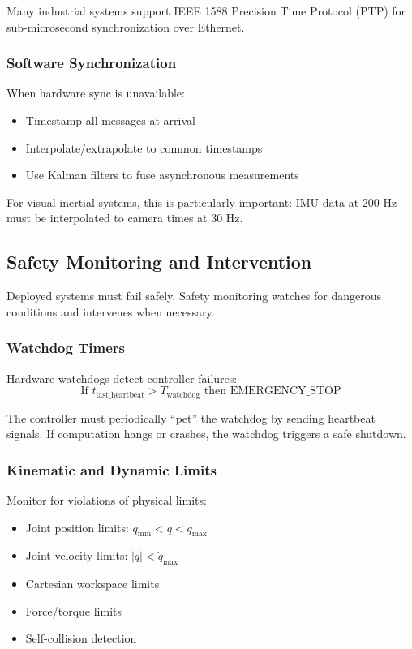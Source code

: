 Many industrial systems support IEEE 1588 Precision Time Protocol (PTP) for sub-microsecond synchronization over Ethernet.

\subsubsection{Software Synchronization}

When hardware sync is unavailable:
\begin{itemize}
    \item Timestamp all messages at arrival
    \item Interpolate/extrapolate to common timestamps
    \item Use Kalman filters to fuse asynchronous measurements
\end{itemize}

For visual-inertial systems, this is particularly important: IMU data at 200 Hz must be interpolated to camera times at 30 Hz.

\subsection{Safety Monitoring and Intervention}

Deployed systems must fail safely. Safety monitoring watches for dangerous conditions and intervenes when necessary.

\subsubsection{Watchdog Timers}

Hardware watchdogs detect controller failures:
\begin{equation}
\text{If } t_{\text{last\_heartbeat}} > T_{\text{watchdog}} \text{ then } \text{EMERGENCY\_STOP}
\end{equation}

The controller must periodically ``pet'' the watchdog by sending heartbeat signals. If computation hangs or crashes, the watchdog triggers a safe shutdown.

\subsubsection{Kinematic and Dynamic Limits}

Monitor for violations of physical limits:
\begin{itemize}
    \item Joint position limits: $q_{\min} < q < q_{\max}$
    \item Joint velocity limits: $|\dot{q}| < \dot{q}_{\max}$
    \item Cartesian workspace limits
    \item Force/torque limits
    \item Self-collision detection
\end{itemize}

